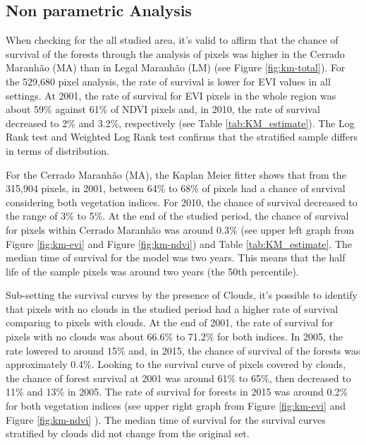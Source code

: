 \subsection{Non parametric Analysis} \label{resultssection1}
When checking for the all studied area, it's valid to affirm that the chance of survival of the forests through the analysis of pixels was higher in the Cerrado Maranhão (MA) than in Legal Maranhão (LM) (see Figure \ref{fig:km-total}). For the 529,680 pixel analysis, the rate of survival is lower for EVI values in all settings. At 2001, the rate of survival for EVI pixels in the whole region was about 59\% against 61\% of NDVI pixels and, in 2010, the rate of survival decreased to 2\% and 3.2\%, respectively (see Table \ref{tab:KM_estimate}). The Log Rank test and Weighted Log Rank test confirms that the stratified sample differs in terms of distribution. 

For the Cerrado Maranhão (MA), the Kaplan Meier fitter shows that from the 315,904 pixels, in 2001, between 64\% to 68\% of pixels had a chance of survival considering both vegetation indices. For 2010, the chance of survival decreased to the range of 3\% to 5\%. At the end of the studied period, the chance of survival for pixels within Cerrado Maranhão was around 0.3\% (see upper left graph from Figure \ref{fig:km-evi} and Figure \ref{fig:km-ndvi}) and Table \ref{tab:KM_estimate}. The median time of survival for the model was two years. This means that the half life of the sample pixels was around two years (the 50th percentile).


Sub-setting the survival curves by the presence of Clouds, it's possible to identify that pixels with no clouds in the studied period had a higher rate of survival comparing to pixels with clouds. At the end of 2001, the rate of survival for pixels with no clouds was about 66.6\% to 71.2\% for both indices. In 2005, the rate lowered to around 15\% and, in 2015, the chance of survival of the forests was approximately 0.4\%. Looking to the survival curve of pixels covered by clouds, the chance of forest survival at 2001 was around 61\% to 65\%, then decreased to 11\% and 13\% in 2005. The rate of survival for forests in 2015 was around 0.2\% for both vegetation indices (see upper right graph from Figure \ref{fig:km-evi} and Figure \ref{fig:km-ndvi} ). The median time of survival for the survival curves stratified by clouds did not change from the original set. 

